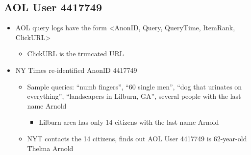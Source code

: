 \documentclass[11pt]{article}
\theoremstyle{definition}
\begin{document}
\subsection{AOL User 4417749}
\begin{itemize}
    \item AOL query logs have the form
    <AnonID, Query, QueryTime, ItemRank, ClickURL>
    \begin{itemize}
        \item ClickURL is the truncated URL
    \end{itemize} 
    \item NY Times re-identified AnonID 4417749
    \begin{itemize}
        \item Sample queries: “numb fingers”, “60 single men”,
        “dog that urinates on everything”, “landscapers
        in Lilburn, GA”, several people with the last
        name Arnold
        \begin{itemize}
            \item Lilburn area has only 14 citizens with the last
            name Arnold
        \end{itemize}
        \item NYT contacts the 14 citizens, finds out AOL User
        4417749 is 62-year-old Thelma Arnold
    \end{itemize}
\end{itemize}
\end{document}
